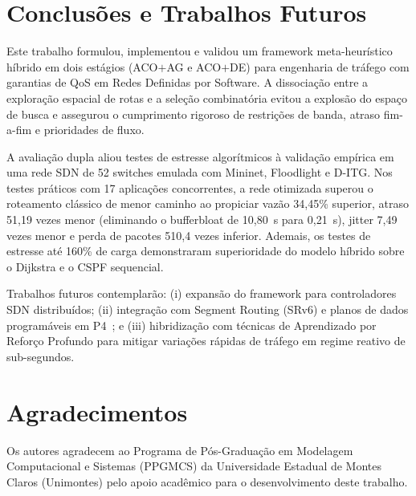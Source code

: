 \documentclass[journal]{IEEEtran}
\begin{document}
\section{Conclus\~{o}es e Trabalhos Futuros}
\label{sec:conclusao}
Este trabalho formulou, implementou e validou um framework meta-heur\'{i}stico h\'{i}brido em dois est\'{a}gios (ACO$+$AG e ACO$+$DE) para engenharia de tr\'{a}fego com garantias de QoS em Redes Definidas por Software. A dissocia\c{c}\~{a}o entre a explora\c{c}\~{a}o espacial de rotas e a sele\c{c}\~{a}o combinat\'{o}ria evitou a explos\~{a}o do espa\c{c}o de busca e assegurou o cumprimento rigoroso de restri\c{c}\~{o}es de banda, atraso fim-a-fim e prioridades de fluxo.

A avalia\c{c}\~{a}o dupla aliou testes de estresse algor\'{i}tmicos \`{a} valida\c{c}\~{a}o emp\'{i}rica em uma rede SDN de 52 switches emulada com Mininet, Floodlight e D-ITG. Nos testes pr\'{a}ticos com 17 aplica\c{c}\~{o}es concorrentes, a rede otimizada superou o roteamento cl\'{a}ssico de menor caminho ao propiciar vaz\~{a}o 34,45\% superior, atraso 51,19 vezes menor (eliminando o bufferbloat de 10,80~s para 0,21~s), jitter 7,49 vezes menor e perda de pacotes 510,4 vezes inferior. Ademais, os testes de estresse at\'{e} 160\% de carga demonstraram superioridade do modelo h\'{i}brido sobre o Dijkstra e o CSPF sequencial.

Trabalhos futuros contemplar\~{a}o: (i) expans\~{a}o do framework para controladores SDN distribu\'{i}dos; (ii) integra\c{c}\~{a}o com Segment Routing (SRv6) e planos de dados program\'{a}veis em P4~\cite{cascone2020p4}; e (iii) hibridiza\c{c}\~{a}o com t\'{e}cnicas de Aprendizado por Refor\c{c}o Profundo para mitigar varia\c{c}\~{o}es r\'{a}pidas de tr\'{a}fego em regime reativo de sub-segundos.

\section*{Agradecimentos}
Os autores agradecem ao Programa de P\'{o}s-Gradua\c{c}\~{a}o em Modelagem Computacional e Sistemas (PPGMCS) da Universidade Estadual de Montes Claros (Unimontes) pelo apoio acad\^{e}mico para o desenvolvimento deste trabalho.



\end{document}
